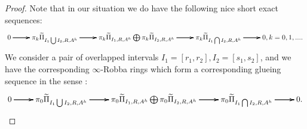 \documentclass[12pt]{amsart}
\theoremstyle{definition}
\numberwithin{equation}{section}
\begin{document}
\begin{proof}
Note that in our situation we do have the following nice short exact sequences:
\[
\xymatrix@C+0pc@R+0pc{
0\ar[r] \ar[r] \ar[r] &\pi_k \widetilde{\Pi}_{I_1\bigcup I_2,R,A^h} \ar[r] \ar[r] \ar[r] &\pi_k\widetilde{\Pi}_{I_1,R,A^h}\bigoplus \pi_k\widetilde{\Pi}_{I_2,R,A^h} \ar[r] \ar[r] \ar[r] &\pi_k\widetilde{\Pi}_{I_1\bigcap I_2,R,A^h} \ar[r] \ar[r] \ar[r] &0, k=0,1,....
}
\]
We consider a pair of overlapped intervals $I_1=[r_1,r_2],I_2=[s_1,s_2]$, and we have the corresponding $\infty$-Robba rings which form a corresponding glueing sequence in the sense \cite[Definition 2.7.3]{KL1}:
\[
\xymatrix@C+0pc@R+0pc{
0\ar[r] \ar[r] \ar[r] &\pi_0\widetilde{\Pi}_{I_1\bigcup I_2,R,A^h} \ar[r] \ar[r] \ar[r] &\pi_0\widetilde{\Pi}_{I_1,R,A^h}\bigoplus \pi_0\widetilde{\Pi}_{I_2,R,A^h} \ar[r] \ar[r] \ar[r] &\pi_0\widetilde{\Pi}_{I_1\bigcap I_2,R,A^h} \ar[r] \ar[r] \ar[r] &0.
}
\] 	


\end{proof}
\end{document}
